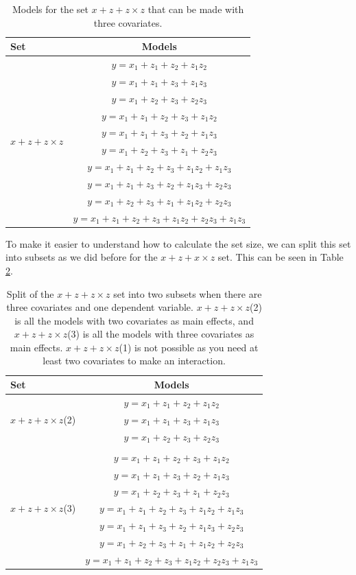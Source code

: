 \begin{table}{}
\centering
\caption{Models for the set $x + z + z \times z$ that can be made with three covariates.}
\label{tab:appmodel3}
\begin{tabular}{lc} \hline
\toprule
Set & Models \\
\midrule
\multirow{10}{*}{$x + z + z \times z$} & $y=x_1+z_1+z_2+z_1z_2$\\ & $y=x_1+z_1+z_3+z_1z_3$\\ & $y=x_1+z_2+z_3+z_2z_3$\\ & $y=x_1+z_1+z_2+z_3+z_1z_2$\\ & $y=x_1+z_1+z_3+z_2+z_1z_3$\\ & $y=x_1+z_2+z_3+z_1+z_2z_3$\\ & $y=x_1+z_1+z_2+z_3+z_1z_2+z_1z_3$\\ & $y=x_1+z_1+z_3+z_2+z_1z_3+z_2z_3$\\ & $y=x_1+z_2+z_3+z_1+z_1z_2+z_2z_3$\\ & $y=x_1+z_1+z_2+z_3+z_1z_2+z_2z_3+z_1z_3$ \\
\bottomrule
\end{tabular}
\end{table}

To make it easier to understand how to calculate the set size, we can split this set into subsets as we did before for the $x + z + x \times z$ set. This can be seen in Table \ref{tab:appmodel4}.

\begin{table}
\centering
\caption{Split of the $x + z + z \times z$ set into two subsets when there are three covariates and one dependent variable. $x + z + z \times z$(2) is all the models with two covariates as main effects, and $x + z + z \times z$(3) is all the models with three covariates as main effects. $x + z + z \times z$(1) is not possible as you need at least two covariates to make an interaction.}
\label{tab:appmodel4}
\begin{tabular}{lc} 
\toprule
Set & Models \\ 
\midrule
\multirow{3}{*}{$x + z + z \times z$(2)} & $y=x_1+z_1+z_2+z_1z_2$\\ & $y=x_1+z_1+z_3+z_1z_3$\\ & $y=x_1+z_2+z_3+z_2z_3$\\ &  \\  
\multirow{7}{*}{$x + z + z \times z$(3)} & $y=x_1+z_1+z_2+z_3+z_1z_2$\\ & $y=x_1+z_1+z_3+z_2+z_1z_3$\\ & $y=x_1+z_2+z_3+z_1+z_2z_3$\\ & $y=x_1+z_1+z_2+z_3+z_1z_2+z_1z_3$\\ & $y=x_1+z_1+z_3+z_2+z_1z_3+z_2z_3$\\ & $y=x_1+z_2+z_3+z_1+z_1z_2+z_2z_3$\\ & $y=x_1+z_1+z_2+z_3+z_1z_2+z_2z_3+z_1z_3$\\ 
\bottomrule
\end{tabular}
\end{table}

